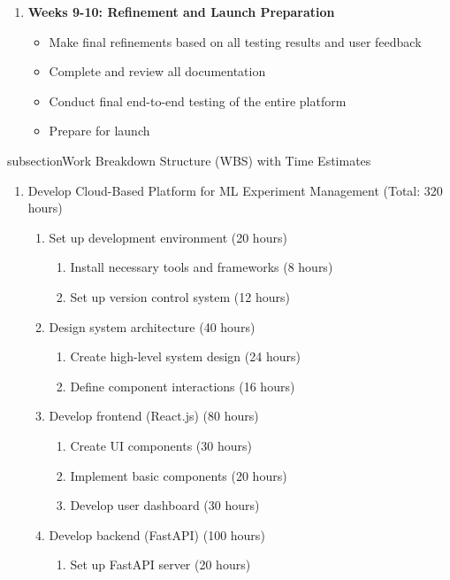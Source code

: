 \documentclass[12pt]{article}
\begin{document}
\begin{enumerate}
    \item \textbf{Weeks 9-10: Refinement and Launch Preparation}
    \begin{itemize}
        \item Make final refinements based on all testing results and user feedback
        \item Complete and review all documentation
        \item Conduct final end-to-end testing of the entire platform
        \item Prepare for launch
    \end{itemize}
\end{enumerate}


subsection{Work Breakdown Structure (WBS) with Time Estimates}

\begin{enumerate}
    \item Develop Cloud-Based Platform for ML Experiment Management (Total: 320 hours)
    \begin{enumerate}
        \item Set up development environment (20 hours)
        \begin{enumerate}
            \item Install necessary tools and frameworks (8 hours)
            \item Set up version control system (12 hours)
        \end{enumerate}
        \item Design system architecture (40 hours)
        \begin{enumerate}
            \item Create high-level system design (24 hours)
            \item Define component interactions (16 hours)
        \end{enumerate}
        \item Develop frontend (React.js) (80 hours)
        \begin{enumerate}
            \item Create UI components (30 hours)
            \item Implement basic components (20 hours)
            \item Develop user dashboard (30 hours)
        \end{enumerate}
        \item Develop backend (FastAPI) (100 hours)
        \begin{enumerate}
            \item Set up FastAPI server (20 hours)

\end{enumerate}
\end{enumerate}
\end{enumerate}
\end{document}
